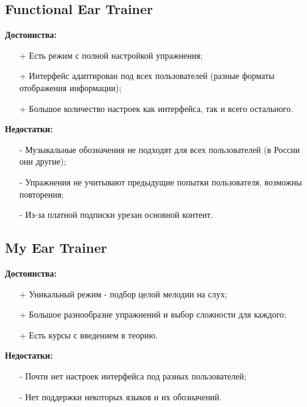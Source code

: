 \subsection[Functional Ear Trainer]{Functional Ear Trainer\cite{Apps2}}
\begin{minipage}[t]{0.45\textwidth}
\textbf{Достоинства:}
\begin{itemize}
  \item[+] Есть режим с полной настройкой упражнения;
  \item[+] Интерфейс адаптирован под всех пользователей (разные форматы отображения информации);
  \item[+] Большое количество настроек как интерфейса, так и всего остального.
\end{itemize}
\end{minipage}
\hfill
\begin{minipage}[t]{0.45\textwidth}
\textbf{Недостатки:}
\begin{itemize}
  \item[-] Музыкальные обозначения не подходят для всех пользователей (в России они другие);
  \item[-] Упражнения не учитывают предыдущие попытки пользователя, возможны повторения;
  \item[-] Из-за платной подписки урезан основной контент.
\end{itemize}
\end{minipage}
\subsection[My Ear Trainer]{My Ear Trainer\cite{Apps3}}
\begin{minipage}[t]{0.45\textwidth}
\textbf{Достоинства:}
\begin{itemize}
  \item[+] Уникальный режим - подбор целой мелодии на слух;
  \item[+] Большое разнообразие упражнений и выбор сложности для каждого;
  \item[+] Есть курсы с введением в теорию.
\end{itemize}
\end{minipage}
\hfill
\begin{minipage}[t]{0.45\textwidth}
\textbf{Недостатки:}
\begin{itemize}
  \item[-] Почти нет настроек интерфейса под разных пользователей;
  \item[-] Нет поддержки некоторых языков и их обозначений.
\end{itemize}
\end{minipage}

